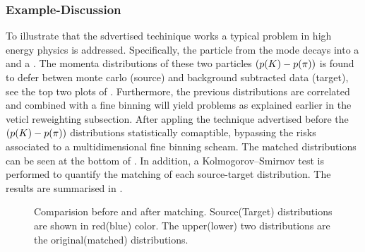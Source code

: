 \subsubsection{Example-Discussion}
To illustrate that the sdvertised techinique works a typical problem in high energy physics is addressed.
Specifically, the \Kstarz particle from the \BsJpsiKst mode decays into a \kaon and a \pion. The momenta
distributions of these two particles $\left( \mbox{$p$}(K)-\mbox{$p$}(\pi) \right)$ is found to defer betwen
monte carlo (source) and background subtracted data (target), see the top two plots of .
Furthermore, the previous distributions are correlated and combined with a fine binning will yield problems as explained
earlier in the veticl reweighting subsection. After appling the technique advertised before the
$\left( \mbox{$p$}(K)-\mbox{$p$}(\pi) \right)$ distributions statistically comaptible, bypassing the risks associated
to a multidimensional fine binning scheam. The matched distributions can be seen at the bottom of .
In addition, a Kolmogorov–Smirnov test is performed to quantify the matching of each source-target distribution.
The results are summarised in .

\begin{figure}[!t!]
  \centering
  \begin{subfigure}{0.5\textwidth}
    \raggedright
    \scalebox{1.15}{}
    \caption{}
    \label{kplus_rew_original}
  \end{subfigure}%
  \hfill
  \begin{subfigure}{0.5\textwidth}
    \raggedleft
    \scalebox{1.15}{}
    \caption{}
    \label{pminus_rew_original}
  \end{subfigure}
\begin{subfigure}{0.5\textwidth}
    \raggedright
    \scalebox{1.15}{}
    \caption{}
    \label{kplus_rew_matched}
  \end{subfigure}%
  \hfill
  \begin{subfigure}{0.5\textwidth}
    \raggedleft
    \scalebox{1.15}{}
    \caption{}
    \label{pminus_rew_matched}
  \end{subfigure}
  \caption{Comparision before and after matching. Source(Target) distributions are shown in red(blue) color.
   The upper(lower) two distributions are the original(matched) distributions.}
  \label{hor_rew_example_figs}
\end{figure}

